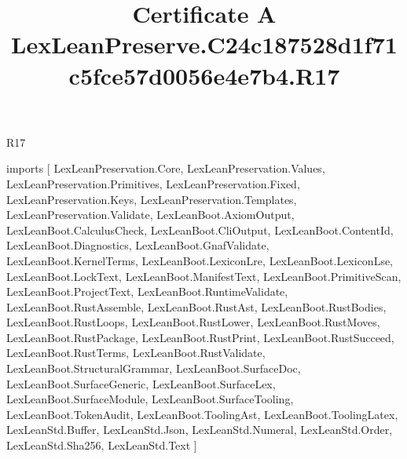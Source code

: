 \begin{lexlean}{R17}
\title{Certificate A LexLeanPreserve.C24c187528d1f71c5fce57d0056e4e7b4.R17}
\begin{coremodule}
imports [
  LexLeanPreservation.Core,
  LexLeanPreservation.Values,
  LexLeanPreservation.Primitives,
  LexLeanPreservation.Fixed,
  LexLeanPreservation.Keys,
  LexLeanPreservation.Templates,
  LexLeanPreservation.Validate,
  LexLeanBoot.AxiomOutput,
  LexLeanBoot.CalculusCheck,
  LexLeanBoot.CliOutput,
  LexLeanBoot.ContentId,
  LexLeanBoot.Diagnostics,
  LexLeanBoot.GnafValidate,
  LexLeanBoot.KernelTerms,
  LexLeanBoot.LexiconLre,
  LexLeanBoot.LexiconLse,
  LexLeanBoot.LockText,
  LexLeanBoot.ManifestText,
  LexLeanBoot.PrimitiveScan,
  LexLeanBoot.ProjectText,
  LexLeanBoot.RuntimeValidate,
  LexLeanBoot.RustAssemble,
  LexLeanBoot.RustAst,
  LexLeanBoot.RustBodies,
  LexLeanBoot.RustLoops,
  LexLeanBoot.RustLower,
  LexLeanBoot.RustMoves,
  LexLeanBoot.RustPackage,
  LexLeanBoot.RustPrint,
  LexLeanBoot.RustSucceed,
  LexLeanBoot.RustTerms,
  LexLeanBoot.RustValidate,
  LexLeanBoot.StructuralGrammar,
  LexLeanBoot.SurfaceDoc,
  LexLeanBoot.SurfaceGeneric,
  LexLeanBoot.SurfaceLex,
  LexLeanBoot.SurfaceModule,
  LexLeanBoot.SurfaceTooling,
  LexLeanBoot.TokenAudit,
  LexLeanBoot.ToolingAst,
  LexLeanBoot.ToolingLatex,
  LexLeanStd.Buffer,
  LexLeanStd.Json,
  LexLeanStd.Numeral,
  LexLeanStd.Order,
  LexLeanStd.Sha256,
  LexLeanStd.Text
]


\end{coremodule}
\end{lexlean}
